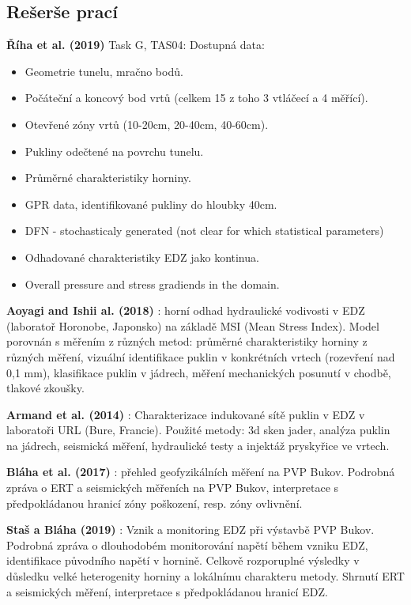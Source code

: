 \documentclass{article}
\begin{document}
\subsection{Rešerše prací}

{\bf Říha et al. (2019)} Task G, TAS04: Dostupná data: 
\begin{itemize}
    \item Geometrie tunelu, mračno bodů.
    \item Počáteční a koncový bod vrtů (celkem 15 z toho 3 vtláčecí a 4 měřící).
    \item Otevřené zóny vrtů (10-20cm, 20-40cm, 40-60cm).
    \item Pukliny odečtené na povrchu tunelu.
    \item Průměrné charakteristiky horniny.
    \item GPR data, identifikované pukliny do hloubky 40cm.
    \item DFN - stochasticaly generated (not clear for which statistical parameters)
    \item Odhadované charakteristiky EDZ jako kontinua.
    \item Overall pressure and stress gradiends in the domain.
\end{itemize}

{\bf Aoyagi and Ishii al. (2018)} \cite{Aoyagi2018}: horní odhad hydraulické vodivosti v EDZ (laboratoř Horonobe, Japonsko) na základě MSI (Mean Stress Index). Model porovnán s měřením z různých metod: průměrné charakteristiky horniny z různých měření, vizuální identifikace puklin v konkrétních vrtech (rozevření nad 0,1 mm), klasifikace puklin v jádrech, měření mechanických posunutí v chodbě, tlakové zkoušky.

{\bf Armand et al. (2014)} \cite{Armand2014}: Charakterizace indukované sítě puklin v EDZ v laboratoři URL (Bure, Francie). Použité metody: 3d sken jader, analýza puklin na jádrech, seismická měření, hydraulické testy a injektáž pryskyřice ve vrtech. 

{\bf Bláha et al. (2017)} \cite{SURAO_184/2014}: přehled geofyzikálních měření na PVP Bukov.
Podrobná zpráva o ERT a seismických měřeních na PVP Bukov, interpretace s předpokládanou hranicí zóny poškození, resp. zóny ovlivnění.  

{\bf Staš a Bláha (2019)} \cite{SURAO_351/2019}: Vznik a monitoring EDZ při výstavbě PVP Bukov.
Podrobná zpráva o dlouhodobém monitorování napětí během vzniku EDZ, identifikace původního napětí v hornině. Celkově rozporuplné výsledky v důsledku velké heterogenity horniny a lokálnímu charakteru metody. Shrnutí ERT a seismických měření, interpretace s předpokládanou hranicí EDZ.  
\end{document}
